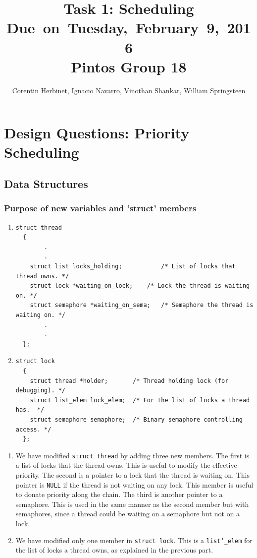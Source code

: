 \documentclass{article}
\title{
\vspace{2in}
\textmd{\textbf{Task 1: Scheduling}}\\
\normalsize\vspace{0.1in}\small{Due\ on\ Tuesday,\ February\ 9,\ 2016}\\
\vspace{0.1in}\large{\textbf{Pintos Group 18}}
\vspace{3in}
}
\author{Corentin Herbinet, Ignacio Navarro, Vinothan Shankar, William Springsteen}
\date{}
\renewcommand{\_}{\char`_}
\begin{document}
\maketitle
\newpage

\section{Design Questions: Priority Scheduling}
\subsection{Data Structures}
\subsubsection{Purpose of new variables and 'struct' members}

\begin{enumerate}

\item \begin{lstlisting}
struct thread
  {
		.
		.
    struct list locks_holding;           /* List of locks that thread owns. */
    struct lock *waiting_on_lock; 	 /* Lock the thread is waiting on. */ 
    struct semaphore *waiting_on_sema;   /* Semaphore the thread is waiting on. */
		.
		.
  };
\end{lstlisting}

\item \begin{lstlisting}
struct lock 
  {
    struct thread *holder;       /* Thread holding lock (for debugging). */
    struct list_elem lock_elem;  /* For the list of locks a thread has.  */
    struct semaphore semaphore;  /* Binary semaphore controlling access. */
  };
\end{lstlisting}
\end{enumerate}


\begin{enumerate}

\item We have modified \texttt{struct thread} by adding three new members. The first is a list of locks that the thread owns. This 
is useful to modify the effective priority. The second is a pointer to a lock that the thread is waiting on. This pointer is \texttt{NULL}
if the thread is not waiting on any lock. This member is useful to donate priority along the chain. The third is another pointer to a semaphore. This is used in the same manner as the second member but with semaphores, since a thread could be waiting on a semaphore but not on a lock.

\item We have modified only one member in \texttt{struct lock}. This is a \texttt{list\_elem} for the list of locks a thread owns, as explained
in the previous part.
\end{enumerate}
\end{document}
